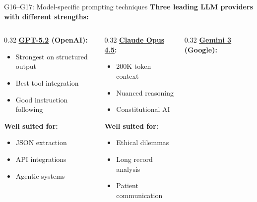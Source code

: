 \documentclass[aspectratio=169, 10pt]{beamer}
\begin{document}
\begin{frame}{G16--G17: Model-specific prompting techniques}
    \textbf{Three leading LLM providers with different strengths:}
    
    \vspace{0.2cm}
    \begin{columns}[T]
        \begin{column}{0.32\textwidth}
            \textbf{\href{https://openai.com/gpt-5}{GPT-5.2} (OpenAI):}
            \footnotesize
            \begin{itemize}
                \item Strongest on structured output
                \item Best tool integration
                \item Good instruction following
            \end{itemize}
            \textbf{Well suited for:}
            \begin{itemize}
                \item JSON extraction
                \item API integrations
                \item Agentic systems
            \end{itemize}
        \end{column}
        \begin{column}{0.32\textwidth}
            \textbf{\href{https://anthropic.com/claude}{Claude Opus 4.5}:}
            \footnotesize
            \begin{itemize}
                \item 200K token context
                \item Nuanced reasoning
                \item Constitutional AI
            \end{itemize}
            \textbf{Well suited for:}
            \begin{itemize}
                \item Ethical dilemmas
                \item Long record analysis
                \item Patient communication
            \end{itemize}
        \end{column}
        \begin{column}{0.32\textwidth}
            \textbf{\href{https://deepmind.google/gemini}{Gemini 3} (Google):}
            \footnotesize
            \begin{itemize}

\end{itemize}
\end{column}
\end{columns}
\end{frame}
\end{document}
